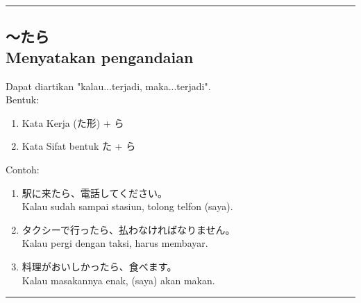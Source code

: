 \vspace{0.2cm}\hrule height 1pt\vspace{0.2cm}


\subsection*{
    ～たら \\
    Menyatakan pengandaian
}
Dapat diartikan "kalau...terjadi, maka...terjadi".\\
Bentuk:
\begin{enumerate}
    \item Kata Kerja (た形) + ら
    \item Kata Sifat bentuk た + ら
\end{enumerate}
Contoh: 
\begin{enumerate}
    \item 駅に来たら、電話してください。
    \\ Kalau sudah sampai stasiun, tolong telfon (saya).
    \item タクシーで行ったら、払わなければなりません。
    \\ Kalau pergi dengan taksi, harus membayar.
    \item 料理がおいしかったら、食べます。
    \\ Kalau masakannya enak, (saya) akan makan.
\end{enumerate}

\vspace{0.2cm}\hrule height 1pt\vspace{0.2cm}


